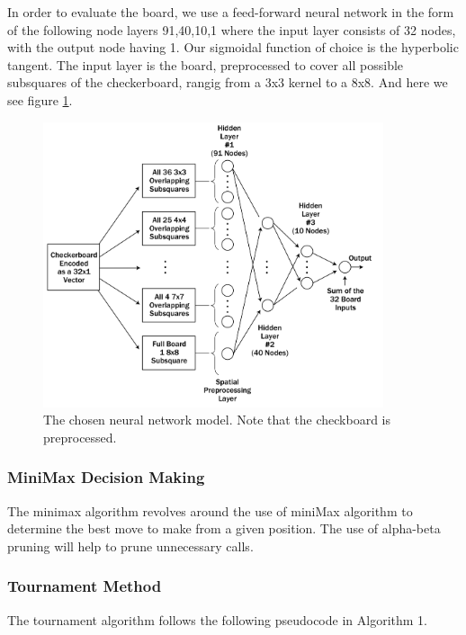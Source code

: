\documentclass[12pt,a4paper]{article}
\begin{document}
In order to evaluate the board, we use a feed-forward neural network in the form of the following node layers {91,40,10,1} where the input layer consists of 32 nodes, with the output node having 1. Our sigmoidal function of choice is the hyperbolic tangent. The input layer is the board, preprocessed to cover all possible subsquares of the checkerboard, rangig from a 3x3 kernel to a 8x8. And here we see figure \ref{overflow}.

\begin{figure}[ht!]
    \centering
    \includegraphics[width=100mm]{nnmodel.png}
    \caption{The chosen neural network model. Note that the checkboard is preprocessed. \label{overflow}}
\end{figure}

\subsubsection{MiniMax Decision Making}

The minimax algorithm revolves around the use of miniMax algorithm to determine the best move to make from a given position. The use of alpha-beta pruning will help to prune unnecessary calls.

\subsubsection{Tournament Method}

The tournament algorithm follows the following pseudocode in Algorithm 1.
\end{document}
